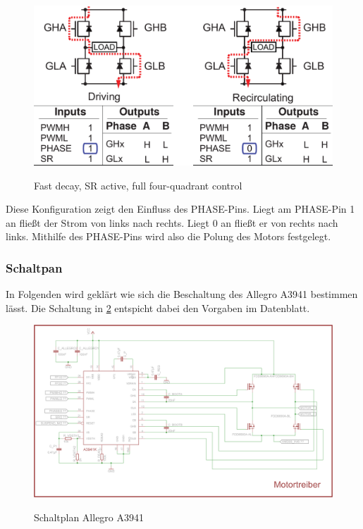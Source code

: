 \begin{figure}[H]
\centering
\includegraphics[width=.8\textwidth]{3941_5.png}\\
\caption{Fast decay, SR active, full four-quadrant control \cite{ds-A3941}}%
\label{fig:39415}
\end{figure}

Diese Konfiguration zeigt den Einfluss des PHASE-Pins. Liegt am PHASE-Pin 1 an
fließt der Strom von links nach rechts. Liegt 0 an fließt er von rechts nach links.
Mithilfe des PHASE-Pins wird also die Polung des Motors festgelegt.


\subsubsection{Schaltpan}

In Folgenden wird geklärt wie sich die Beschaltung des Allegro A3941 bestimmen lässt. Die Schaltung in \cref{fig:schalt:allegro} entspicht dabei den Vorgaben im Datenblatt.

\begin{figure}[H]
\centering
\includegraphics[width=.9\textwidth]{motortreiber.png}\\
\caption{Schaltplan Allegro A3941}%
\label{fig:schalt:allegro}
\end{figure}

